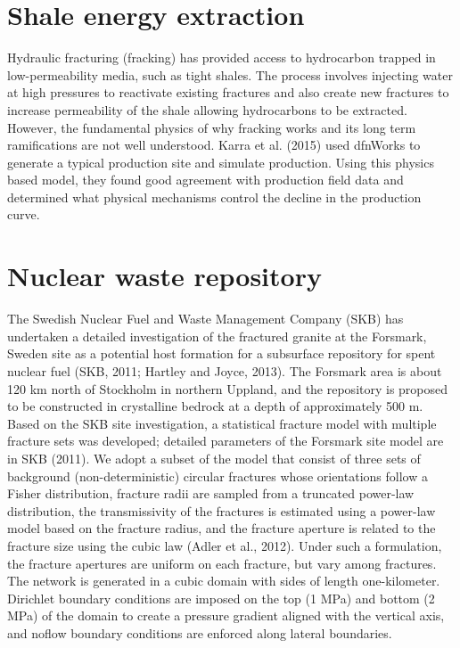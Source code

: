 \documentclass[letterpaper,10pt,english]{sphinxmanual}
\begin{document}
\section{Shale energy extraction}
\label{\detokenize{applications:shale-energy-extraction}}
Hydraulic fracturing (fracking) has provided access to hydrocarbon trapped in low-permeability media, such as tight shales. The process involves injecting water at high pressures to reactivate existing fractures and also create new fractures to increase permeability of the shale allowing hydrocarbons to be extracted. However, the fundamental physics of why fracking works and its long term ramifications are not well understood. Karra et al. (2015) used dfnWorks to generate a typical production site and simulate production. Using this physics based model, they found good agreement with production field data and determined what physical mechanisms control the decline in the production curve.

\begin{figure}[htbp]
\centering
\capstart

\noindent{}
\caption{}\label{\detokenize{applications:id2}}\end{figure}


\section{Nuclear waste repository}
\label{\detokenize{applications:nuclear-waste-repository}}
The Swedish Nuclear Fuel and Waste Management Company (SKB) has undertaken a detailed investigation of the fractured granite at the Forsmark, Sweden site as a potential host formation for a subsurface repository for spent nuclear fuel (SKB, 2011; Hartley and Joyce, 2013). The Forsmark area is about 120 km north of Stockholm in northern Uppland, and the repository is proposed
to be constructed in crystalline bedrock at a depth of approximately 500 m. Based on the SKB site investigation, a statistical fracture model with multiple fracture sets was developed; detailed parameters of the Forsmark site model are in SKB (2011). We adopt a subset of the model that consist of three sets of background (non-deterministic) circular fractures whose orientations follow a Fisher distribution, fracture radii are sampled from a truncated power-law distribution, the transmissivity of the fractures is estimated using a power-law model based on the fracture radius, and the fracture aperture is related to the fracture size using the cubic law (Adler et al., 2012). Under such a formulation, the fracture apertures are uniform on each fracture, but vary among fractures. The network is generated in a cubic domain with sides of length one-kilometer. Dirichlet boundary conditions are imposed on the top (1 MPa) and bottom (2 MPa) of the domain to create a pressure gradient aligned with the vertical axis, and noflow boundary conditions are enforced along lateral boundaries.
\end{document}
